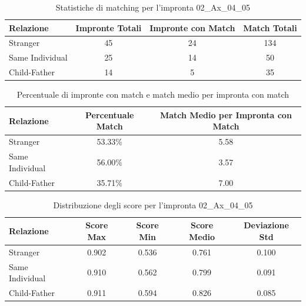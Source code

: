 \begin{table}[htbp]
\centering
\caption{Statistiche di matching per l'impronta 02\_Ax\_04\_05}
\label{tab:results_02_Ax_04_05}
\begin{tabular}{|l|c|c|c|}
\hline
\textbf{Relazione} & \textbf{Impronte Totali} & \textbf{Impronte con Match} & \textbf{Match Totali} \\
\hline
Stranger & 45 & 24 & 134 \\
\hline
Same Individual & 25 & 14 & 50 \\
\hline
Child-Father & 14 & 5 & 35 \\
\hline
\end{tabular}
\end{table}


\begin{table}[htbp]
\centering
\caption{Percentuale di impronte con match e match medio per impronta con match}
\label{tab:match_percentage_02_Ax_04_05}
\begin{tabular}{|l|c|c|}
\hline
\textbf{Relazione} & \textbf{Percentuale Match} & \textbf{Match Medio per Impronta con Match} \\
\hline
Stranger & 53.33\% & 5.58 \\
\hline
Same Individual & 56.00\% & 3.57 \\
\hline
Child-Father & 35.71\% & 7.00 \\
\hline
\end{tabular}
\end{table}


\begin{table}[htbp]
\centering
\caption{Distribuzione degli score per l'impronta 02\_Ax\_04\_05}
\label{tab:scores_02_Ax_04_05}
\begin{tabular}{|l|c|c|c|c|}
\hline
\textbf{Relazione} & \textbf{Score Max} & \textbf{Score Min} & \textbf{Score Medio} & \textbf{Deviazione Std} \\
\hline
Stranger & 0.902 & 0.536 & 0.761 & 0.100 \\
\hline
Same Individual & 0.910 & 0.562 & 0.799 & 0.091 \\
\hline
Child-Father & 0.911 & 0.594 & 0.826 & 0.085 \\
\hline
\end{tabular}
\end{table}

